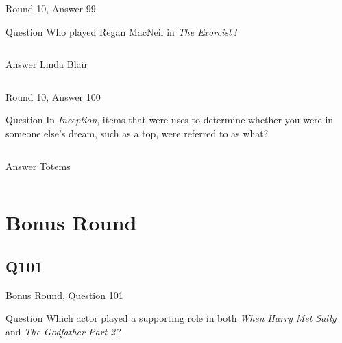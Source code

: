 \documentclass[11pt]{beamer}
\begin{document}
\begin{frame}[t]{Round 10, Answer 99}
\vspace{2em}
\begin{block}{Question}
Who played Regan MacNeil in \emph{The Exorcist}\,?
\end{block}
\pause{}
\begin{columns}[T,totalwidth=\linewidth]
\begin{column}{0.35\linewidth}
\begin{block}{Answer}
Linda Blair
\end{block}
\end{column}
\begin{column}{0.6\linewidth}
\begin{center}
\texttt{[image: \{Images/exorcist]}.jpeg}
\end{center}
\end{column}
\end{columns}
\end{frame}
    

\begin{frame}[t]{Round 10, Answer 100}
\vspace{2em}
\begin{block}{Question}
In \emph{Inception}, items that were uses to determine whether you were in someone else's dream, such as a top, were referred to as what?
\end{block}
\pause{}
\begin{columns}[T,totalwidth=\linewidth]
\begin{column}{0.35\linewidth}
\begin{block}{Answer}
Totems
\end{block}
\end{column}
\begin{column}{0.6\linewidth}
\begin{center}
\texttt{[image: \{Images/totem]}.jpg}
\end{center}
\end{column}
\end{columns}
\end{frame}
    

\section{Bonus Round}
    

\subsection*{Q101}
\begin{frame}[t]{Bonus Round, Question 101}
\vspace{2em}
\begin{block}{Question}
Which actor played a supporting role in both \emph{When Harry Met Sally} and \emph{The Godfather Part 2}\,?
\end{block}
\end{frame}
    
\end{document}
